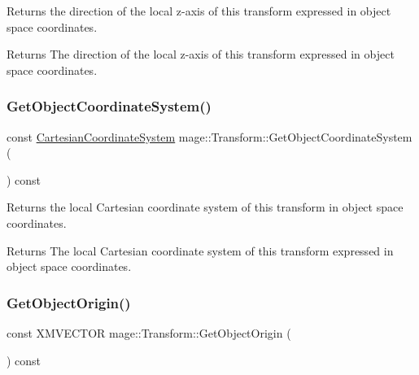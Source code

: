 Returns the direction of the local z-\/axis of this transform expressed in object space coordinates.

\begin{DoxyReturn}{Returns}
The direction of the local z-\/axis of this transform expressed in object space coordinates. 
\end{DoxyReturn}
\hypertarget{structmage_1_1_transform_a051432f12292cd6c46ec2483eca87d86}{}\label{structmage_1_1_transform_a051432f12292cd6c46ec2483eca87d86} 
\subsubsection{\texorpdfstring{Get\+Object\+Coordinate\+System()}{GetObjectCoordinateSystem()}}
{\footnotesize\ttfamily const \hyperlink{structmage_1_1_cartesian_coordinate_system}{Cartesian\+Coordinate\+System} mage\+::\+Transform\+::\+Get\+Object\+Coordinate\+System (\begin{DoxyParamCaption}{ }\end{DoxyParamCaption}) const\hspace{0.3cm}{\ttfamily [noexcept]}}

Returns the local Cartesian coordinate system of this transform in object space coordinates.

\begin{DoxyReturn}{Returns}
The local Cartesian coordinate system of this transform expressed in object space coordinates. 
\end{DoxyReturn}
\hypertarget{structmage_1_1_transform_a138b6649becd0f12b36a7db44e46ce31}{}\label{structmage_1_1_transform_a138b6649becd0f12b36a7db44e46ce31} 
\subsubsection{\texorpdfstring{Get\+Object\+Origin()}{GetObjectOrigin()}}
{\footnotesize\ttfamily const X\+M\+V\+E\+C\+T\+OR mage\+::\+Transform\+::\+Get\+Object\+Origin (\begin{DoxyParamCaption}{ }\end{DoxyParamCaption}) const\hspace{0.3cm}{\ttfamily [noexcept]}}

